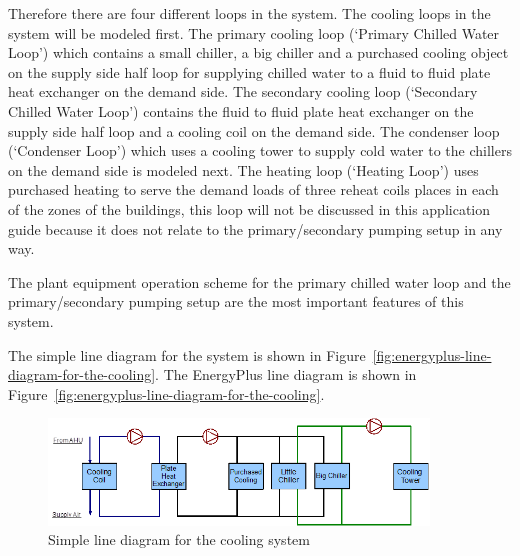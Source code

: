 Therefore there are four different loops in the system. The cooling loops in the system will be modeled first. The primary cooling loop (`Primary Chilled Water Loop') which contains a small chiller, a big chiller and a purchased cooling object on the supply side half loop for supplying chilled water to a fluid to fluid plate heat exchanger on the demand side. The secondary cooling loop (`Secondary Chilled Water Loop') contains the fluid to fluid plate heat exchanger on the supply side half loop and a cooling coil on the demand side. The condenser loop (`Condenser Loop') which uses a cooling tower to supply cold water to the chillers on the demand side is modeled next. The heating loop (`Heating Loop') uses purchased heating to serve the demand loads of three reheat coils places in each of the zones of the buildings, this loop will not be discussed in this application guide because it does not relate to the primary/secondary pumping setup in any way.

The plant equipment operation scheme for the primary chilled water loop and the primary/secondary pumping setup are the most important features of this system.

The simple line diagram for the system is shown in Figure~\ref{fig:energyplus-line-diagram-for-the-cooling}. The EnergyPlus line diagram is shown in Figure~\ref{fig:energyplus-line-diagram-for-the-cooling}.

\begin{figure}[hbtp] %
\centering
\includegraphics[width=0.9\textwidth, height=0.9\textheight, keepaspectratio=true]{media/image088.png}
\caption{Simple line diagram for the cooling system \protect \label{fig:simple-line-diagram-for-the-cooling-system}}
\end{figure}

